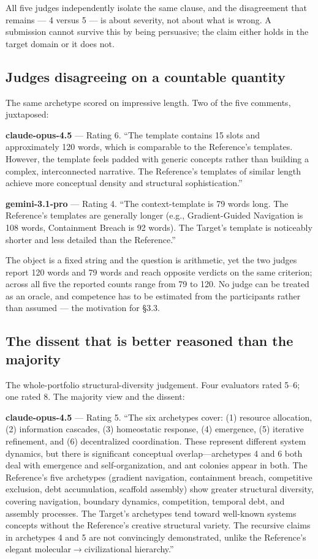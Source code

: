 \documentclass{article}
\begin{document}
All five judges independently isolate the same clause, and the disagreement that remains --- 4 versus 5 --- is about severity, not about what is wrong. A submission cannot survive this by being persuasive; the claim either holds in the target domain or it does not.

\subsection{Judges disagreeing on a countable quantity}\label{judges-disagreeing-on-a-countable-quantity}

The same archetype scored on impressive length. Two of the five comments, juxtaposed:

\textbf{claude-opus-4.5} --- Rating 6. ``The template contains 15 slots and approximately 120 words, which is comparable to the Reference's templates. However, the template feels padded with generic concepts rather than building a complex, interconnected narrative. The Reference's templates of similar length achieve more conceptual density and structural sophistication.''

\textbf{gemini-3.1-pro} --- Rating 4. ``The context-template is 79 words long. The Reference's templates are generally longer (e.g., Gradient-Guided Navigation is 108 words, Containment Breach is 92 words). The Target's template is noticeably shorter and less detailed than the Reference.''

The object is a fixed string and the question is arithmetic, yet the two judges report 120 words and 79 words and reach opposite verdicts on the same criterion; across all five the reported counts range from 79 to 120. No judge can be treated as an oracle, and competence has to be estimated from the participants rather than assumed --- the motivation for \S{}3.3.

\subsection{The dissent that is better reasoned than the majority}\label{the-dissent-that-is-better-reasoned-than-the-majority}

The whole-portfolio structural-diversity judgement. Four evaluators rated 5--6; one rated 8. The majority view and the dissent:

\textbf{claude-opus-4.5} --- Rating 5. ``The six archetypes cover: (1) resource allocation, (2) information cascades, (3) homeostatic response, (4) emergence, (5) iterative refinement, and (6) decentralized coordination. These represent different system dynamics, but there is significant conceptual overlap---archetypes 4 and 6 both deal with emergence and self-organization, and ant colonies appear in both. The Reference's five archetypes (gradient navigation, containment breach, competitive exclusion, debt accumulation, scaffold assembly) show greater structural diversity, covering navigation, boundary dynamics, competition, temporal debt, and assembly processes. The Target's archetypes tend toward well-known systems concepts without the Reference's creative structural variety. The recursive claims in archetypes 4 and 5 are not convincingly demonstrated, unlike the Reference's elegant molecular\ensuremath{\rightarrow}civilizational hierarchy.''
\end{document}

